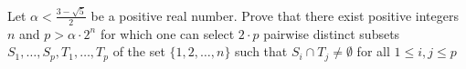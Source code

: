 Let $ \alpha < \frac {3 - \sqrt {5}}{2}$ be a positive real number. Prove that there exist positive integers $ n$ and $ p > \alpha \cdot 2^n$ for which one can select $ 2 \cdot p$ pairwise distinct subsets $ S_1, \ldots, S_p, T_1, \ldots, T_p$ of the set $ \{1,2, \ldots, n\}$ such that $ S_i \cap T_j \neq \emptyset$ for all $ 1 \leq i,j \leq p$